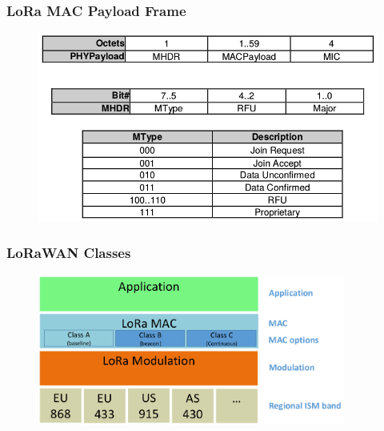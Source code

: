 \begin{frame}[fragile]
  \frametitle{LoRa MAC Payload Frame}
  
 \begin{figure}
  \centering
  \includegraphics[width=\textwidth]{img/mac_frame.png}
  \end{figure}

\end{frame}


\begin{frame}[fragile]
  \frametitle{LoRaWAN Classes}
  \begin{figure}
    \centering
    \includegraphics[width=0.9\textwidth]{img/loraClasses.png}
  \end{figure}
\end{frame}


